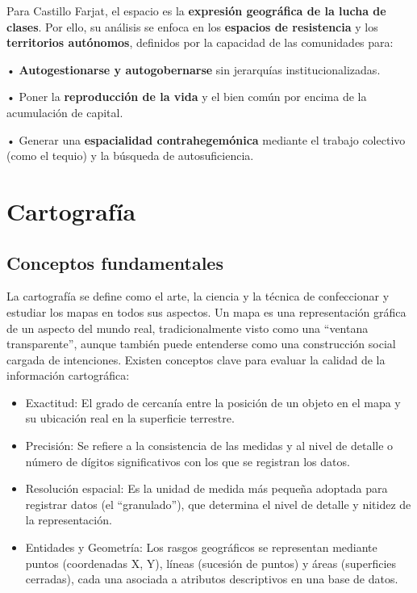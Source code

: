 \documentclass[
  letterpaper,
  DIV=11,
  numbers=noendperiod]{scrreprt}
\providecommand{\tightlist}{%
  \setlength{\itemsep}{0pt}\setlength{\parskip}{0pt}}\usepackage{longtable,booktabs,array}
\begin{document}
Para Castillo Farjat, el espacio es la \textbf{expresión geográfica de
la lucha de clases}. Por ello, su análisis se enfoca en los
\textbf{espacios de resistencia} y los \textbf{territorios autónomos},
definidos por la capacidad de las comunidades para:

• \textbf{Autogestionarse y autogobernarse} sin jerarquías
institucionalizadas.

• Poner la \textbf{reproducción de la vida} y el bien común por encima
de la acumulación de capital.

• Generar una \textbf{espacialidad contrahegemónica} mediante el trabajo
colectivo (como el tequio) y la búsqueda de autosuficiencia.

\section{Cartografía}\label{cartografuxeda}

\subsection{Conceptos fundamentales}\label{conceptos-fundamentales}

La cartografía se define como el arte, la ciencia y la técnica de
confeccionar y estudiar los mapas en todos sus aspectos. Un mapa es una
representación gráfica de un aspecto del mundo real, tradicionalmente
visto como una ``ventana transparente'', aunque también puede entenderse
como una construcción social cargada de intenciones. Existen conceptos
clave para evaluar la calidad de la información cartográfica:

\begin{itemize}
\tightlist
\item
  Exactitud: El grado de cercanía entre la posición de un objeto en el
  mapa y su ubicación real en la superficie terrestre.
\item
  Precisión: Se refiere a la consistencia de las medidas y al nivel de
  detalle o número de dígitos significativos con los que se registran
  los datos.
\item
  Resolución espacial: Es la unidad de medida más pequeña adoptada para
  registrar datos (el ``granulado''), que determina el nivel de detalle
  y nitidez de la representación.
\item
  Entidades y Geometría: Los rasgos geográficos se representan mediante
  puntos (coordenadas X, Y), líneas (sucesión de puntos) y áreas
  (superficies cerradas), cada una asociada a atributos descriptivos en
  una base de datos.
\end{itemize}
\end{document}
